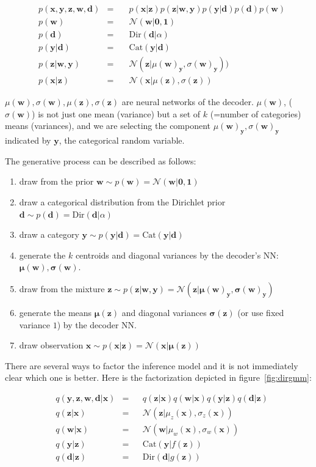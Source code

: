\documentclass[11pt, a4paper]{report}
\theoremstyle{plain}
\theoremstyle{definition}
\theoremstyle{remark}
\newcommand{\x}{\mathbf{x}}
\newcommand{\z}{\mathbf{z}}
\newcommand{\y}{\mathbf{y}}
\newcommand{\w}{\mathbf{w}}
\newcommand{\dd}{\mathbf{d}}
\newcommand{\NN}{\mathcal{N}}
\newcommand{\bv}[1]{\boldsymbol{#1}}
\begin{document}
\begin{equation}
\begin{aligned}
&p(\x, \y, \z, \w, \dd) &=\quad& 
p(\x | \z) p(\z | \w, \y) p(\y | \dd) p(\dd) p(\w) \\
&p(\w) &=\quad& \NN(\w | \bv{0},\bv{1}) \\
&p(\dd) &=\quad& \text{Dir}(\dd | \alpha) \\
&p(\y | \dd) &=\quad& \text{Cat}(\y | \dd) \\
&p(\z | \w, \y) &=\quad& \NN(\z | \mu(\w)_{\y}, \sigma(\w)_{\y})) \\
&p(\x | \z) &=\quad& \NN(\x | \mu(\z), \sigma(\z))
\label{eq:gmmfact}
\end{aligned}
\end{equation}

$\mu(\w), \sigma(\w), \mu(\z), \sigma(\z)$ are neural networks of the decoder.
$\mu(\w)$, ($\sigma(\w)$) is not just one mean (variance) but a set of $k$ (=number of categories)
means (variances), 
and we are selecting the component $\mu(\w)_{\y}, \sigma(\w)_{\y}$
indicated by $\y$, the categorical random
variable.

The generative process can be described as follows:
\begin{enumerate}
\item{} draw from the prior $\w \sim p(\w) = \NN(\w|\bv{0},\bv{1})$
\item{} draw a categorical distribution from the Dirichlet prior
$\dd \sim p(\dd) = \text{Dir}(\dd | \alpha)$
\item{} draw a category $\y \sim p(\y | \dd) = \text{Cat}(\y | \dd)$
\item{} generate the $k$ centroids and diagonal variances by the decoder's NN:
$\bv{\mu}(\w), \bv{\sigma}(\w)$.
\item draw from the mixture $\z \sim p(\z | \w,\y) = \NN(\z|\bv{\mu}(\w)_{\y},
\bv{\sigma}(\w)_{\y})$
\item{} generate the means $\bv{\mu}(\z)$ and diagonal variances
$\bv{\sigma}(\z)$ (or use fixed variance $1$) by the decoder NN.
\item{} draw observation $\x \sim p(\x | \z) = \NN(\x|\bv{\mu}(\z))$
\end{enumerate}

There are several ways to factor the inference model and it is not immediately
clear which one is better. Here is the factorization depicted in
figure~\ref{fig:dirgmm}:

\begin{equation}
\begin{aligned}
&q(\y, \z, \w, \dd | \x) &=& 
&q(\z | \x) q(\w | \x) q(\y | \z) q(\dd | \z) \\
&q(\z | \x) &=& &\NN(\z | \mu_z(\x), \sigma_z(\x)) \\
&q(\w | \x) &=& &\NN(\w | \mu_w(\x), \sigma_w(\x)) \\
&q(\y | \z) &=& &\text{Cat}(\y | f(\z)) \\
&q(\dd | \z) &=& &\text{Dir}(\dd | g(\z))
\label{eq:gmmqfact}
\end{aligned}
\end{equation}
\end{document}
